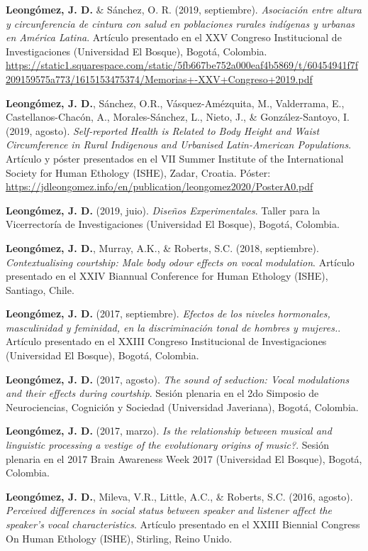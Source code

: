 \documentclass[11pt,a4paper,]{awesome-cv}
\begin{document}
\textbf{Leongómez, J. D.} \& Sánchez, O. R. (2019, septiembre).
\emph{Asociación entre altura y circunferencia de cintura con salud en
poblaciones rurales indígenas y urbanas en América Latina}. Artículo
presentado en el XXV Congreso Institucional de Investigaciones
(Universidad El Bosque), Bogotá, Colombia.
\url{https://static1.squarespace.com/static/5fb667be752a000eaf4b5869/t/60454941f7f209159575a773/1615153475374/Memorias+-XXV+Congreso+2019.pdf}

\textbf{Leongómez, J. D.}, Sánchez, O.R., Vásquez-Amézquita, M.,
Valderrama, E., Castellanos-Chacón, A., Morales-Sánchez, L., Nieto, J.,
\& González-Santoyo, I. (2019, agosto). \emph{Self-reported Health is
Related to Body Height and Waist Circumference in Rural Indigenous and
Urbanised Latin-American Populations}. Artículo y póster presentados en
el VII Summer Institute of the International Society for Human Ethology
(ISHE), Zadar, Croatia. Póster:
\url{https://jdleongomez.info/en/publication/leongomez2020/PosterA0.pdf}

\textbf{Leongómez, J. D.} (2019, juio). \emph{Diseños Experimentales}.
Taller para la Vicerrectoría de Investigaciones (Universidad El Bosque),
Bogotá, Colombia.

\textbf{Leongómez, J. D.}, Murray, A.K., \& Roberts, S.C. (2018,
septiembre). \emph{Contextualising courtship: Male body odour effects on
vocal modulation}. Artículo presentado en el XXIV Biannual Conference
for Human Ethology (ISHE), Santiago, Chile.

\textbf{Leongómez, J. D.} (2017, septiembre). \emph{Efectos de los
niveles hormonales, masculinidad y feminidad, en la discriminación tonal
de hombres y mujeres.}. Artículo presentado en el XXIII Congreso
Institucional de Investigaciones (Universidad El Bosque), Bogotá,
Colombia.

\textbf{Leongómez, J. D.} (2017, agosto). \emph{The sound of seduction:
Vocal modulations and their effects during courtship}. Sesión plenaria
en el 2do Simposio de Neurociencias, Cognición y Sociedad (Universidad
Javeriana), Bogotá, Colombia.

\textbf{Leongómez, J. D.} (2017, marzo). \emph{Is the relationship
between musical and linguistic processing a vestige of the evolutionary
origins of music?}. Sesión plenaria en el 2017 Brain Awareness Week 2017
(Universidad El Bosque), Bogotá, Colombia.

\textbf{Leongómez, J. D.}, Mileva, V.R., Little, A.C., \& Roberts, S.C.
(2016, agosto). \emph{Perceived differences in social status between
speaker and listener affect the speaker's vocal characteristics}.
Artículo presentado en el XXIII Biennial Congress On Human Ethology
(ISHE), Stirling, Reino Unido.
\end{document}
